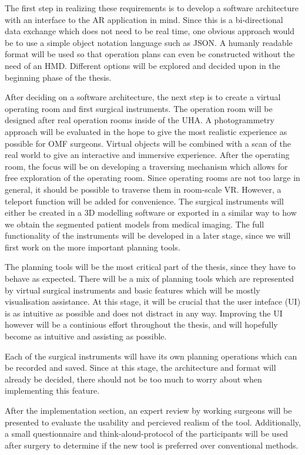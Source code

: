The first step in realizing these requirements is to develop a software architecture with an interface to the AR application in mind.
Since this is a bi-directional data exchange which does not need to be real time, one obvious approach would be to use a simple object notation language such as JSON.
A humanly readable format will be used so that operation plans can even be constructed without the need of an HMD.
Different options will be explored and decided upon in the beginning phase of the thesis.

After deciding on a software architecture, the next step is to create a virtual operating room and first surgical instruments.
The operation room will be designed after real operation rooms inside of the UHA.
A photogrammetry approach will be evaluated in the hope to give the most realistic experience as possible for OMF surgeons.
Virtual objects will be combined with a scan of the real world to give an interactive and immersive experience.
After the operating room, the focus will be on developing a traversing mechanism which allows for free exploration of the operating room.
Since operating rooms are not too large in general, it should be possible to traverse them in room-scale VR.
However, a teleport function will be added for convenience.
The surgical instruments will either be created in a 3D modelling software or exported in a similar way to how we obtain the segmented patient models from medical imaging.
The full functionality of the instruments will be developed in a later stage, since we will first work on the more important planning tools.

The planning tools will be the most critical part of the thesis, since they have to behave as expected.
There will be a mix of planning tools which are represented by virtual surgical instruments and basic features which will be mostly visualisation assistance.
At this stage, it will be crucial that the user inteface (UI) is as intuitive as possible and does not distract in any way.
Improving the UI however will be a continious effort throughout the thesis, and will hopefully become as intuitive and assisting as possible.

Each of the surgical instruments will have its own planning operations which can be recorded and saved.
Since at this stage, the architecture and format will already be decided, there should not be too much to worry about when implementing this feature.

After the implementation section, an expert review by working surgeons will be presented to evaluate the usability and percieved realism of the tool.
Additionally, a small questionnaire and think-aloud-protocol of the participants will be used after surgery to determine if the new tool is preferred over conventional methods.


